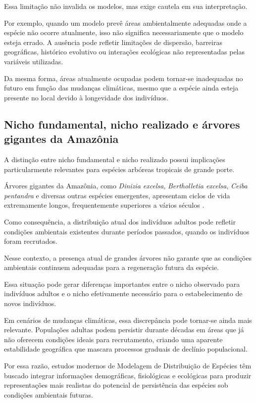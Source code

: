 Essa limitação não invalida os modelos, mas exige cautela em sua interpretação.

Por exemplo, quando um modelo prevê áreas ambientalmente adequadas onde a espécie não ocorre atualmente, isso não significa necessariamente que o modelo esteja errado. A ausência pode refletir limitações de dispersão, barreiras geográficas, histórico evolutivo ou interações ecológicas não representadas pelas variáveis utilizadas.

Da mesma forma, áreas atualmente ocupadas podem tornar-se inadequadas no futuro em função das mudanças climáticas, mesmo que a espécie ainda esteja presente no local devido à longevidade dos indivíduos.

\subsection{Nicho fundamental, nicho realizado e árvores gigantes da Amazônia}

A distinção entre nicho fundamental e nicho realizado possui implicações particularmente relevantes para espécies arbóreas tropicais de grande porte.

Árvores gigantes da Amazônia, como \textit{Dinizia excelsa}, \textit{Bertholletia excelsa}, \textit{Ceiba pentandra} e diversas outras espécies emergentes, apresentam ciclos de vida extremamente longos, frequentemente superiores a vários séculos \parencite{feldpausch2011}.

Como consequência, a distribuição atual dos indivíduos adultos pode refletir condições ambientais existentes durante períodos passados, quando os indivíduos foram recrutados.

Nesse contexto, a presença atual de grandes árvores não garante que as condições ambientais continuem adequadas para a regeneração futura da espécie.

Essa situação pode gerar diferenças importantes entre o nicho observado para indivíduos adultos e o nicho efetivamente necessário para o estabelecimento de novos indivíduos.

Em cenários de mudanças climáticas, essa discrepância pode tornar-se ainda mais relevante. Populações adultas podem persistir durante décadas em áreas que já não oferecem condições ideais para recrutamento, criando uma aparente estabilidade geográfica que mascara processos graduais de declínio populacional.

Por essa razão, estudos modernos de Modelagem de Distribuição de Espécies têm buscado integrar informações demográficas, fisiológicas e ecológicas para produzir representações mais realistas do potencial de persistência das espécies sob condições ambientais futuras.

